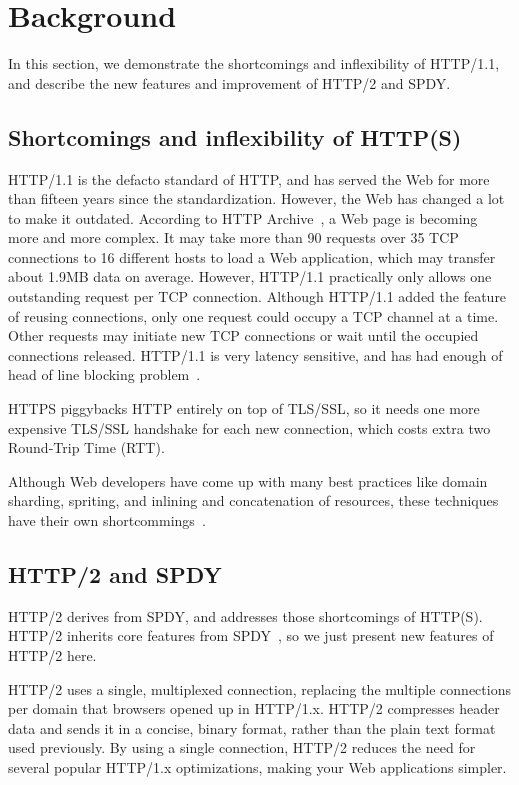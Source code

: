 \section{Background}
In this section, we demonstrate the shortcomings and inflexibility of HTTP/1.1, and describe the new features and improvement of HTTP/2 and SPDY.

\subsection{Shortcomings and inflexibility of HTTP(S)}

HTTP/1.1 is the defacto standard of HTTP, and has served the Web for more than fifteen years since the standardization. However, the Web has changed a lot to make it outdated. According to HTTP Archive~\cite{httparchive}, a Web page is becoming more and more complex. It may take more than 90 requests over 35 TCP connections to 16 different hosts to load a Web application, which may transfer about 1.9MB data on average. However, HTTP/1.1 practically only allows one outstanding request per TCP connection. Although HTTP/1.1 added the feature of reusing connections, only one request could occupy a TCP channel at a time. Other requests may initiate new TCP connections or wait until the occupied connections released. HTTP/1.1 is very latency sensitive, and has had enough of head of line blocking problem~\cite{headoflineblocking}. 

HTTPS piggybacks HTTP entirely on top of TLS/SSL, so it needs one more expensive TLS/SSL handshake for each new connection, which costs extra two Round-Trip Time (RTT).

Although Web developers have come up with many best practices like domain sharding, spriting, and inlining and concatenation of resources, these techniques have their own shortcommings~\cite{Stenberg:CCR14}. 

\subsection{HTTP/2 and SPDY}

HTTP/2 derives from SPDY, and addresses those shortcomings of HTTP(S). HTTP/2 inherits core features from SPDY~\cite{relationwithSDPY}, so we just present new features of HTTP/2 here.

HTTP/2 uses a single, multiplexed connection, replacing the multiple connections per domain that browsers opened up in HTTP/1.x. HTTP/2 compresses header data and sends it in a concise, binary format, rather than the plain text format used previously. By using a single connection, HTTP/2 reduces the need for several popular HTTP/1.x optimizations, making your Web applications simpler. 

